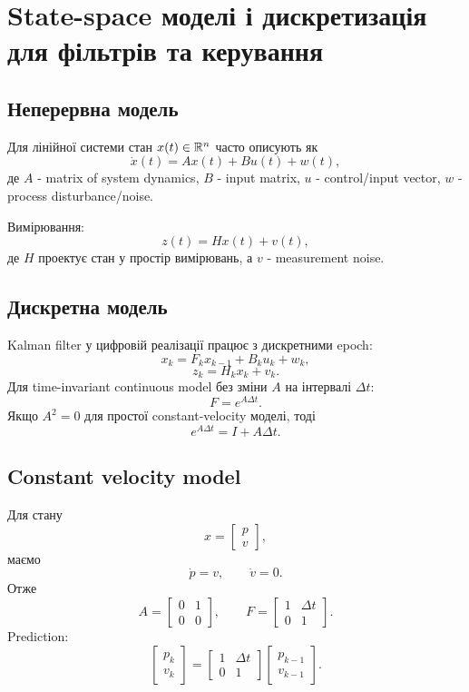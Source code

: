 \chapter{State-space моделі і дискретизація для фільтрів та керування}
\label{ch:state-space-discretization-core}


\section{Неперервна модель}

Для лінійної системи стан $x(t)\in\mathbb{R}^n$ часто описують як
\[
  \dot x(t)=A x(t)+B u(t)+w(t),
\]
де $A$ - matrix of system dynamics, $B$ - input matrix, $u$ - control/input vector, $w$ - process disturbance/noise.

Вимірювання:
\[
  z(t)=H x(t)+v(t),
\]
де $H$ проектує стан у простір вимірювань, а $v$ - measurement noise.

\section{Дискретна модель}

Kalman filter у цифровій реалізації працює з дискретними epoch:
\[
  x_k=F_k x_{k-1}+B_k u_k+w_k,
\]
\[
  z_k=H_k x_k+v_k.
\]
Для time-invariant continuous model без зміни $A$ на інтервалі $\Delta t$:
\[
  F=e^{A\Delta t}.
\]
Якщо $A^2=0$ для простої constant-velocity моделі, тоді
\[
  e^{A\Delta t}=I+A\Delta t.
\]

\section{Constant velocity model}

Для стану
\[
  x=\begin{bmatrix}p\\v\end{bmatrix},
\]
маємо
\[
  \dot p=v,
  \qquad
  \dot v=0.
\]
Отже
\[
  A=\begin{bmatrix}0&1\\0&0\end{bmatrix},
  \qquad
  F=\begin{bmatrix}1&\Delta t\\0&1\end{bmatrix}.
\]
Prediction:
\[
  \begin{bmatrix}p_k\\v_k\end{bmatrix}
  =
  \begin{bmatrix}1&\Delta t\\0&1\end{bmatrix}
  \begin{bmatrix}p_{k-1}\\v_{k-1}\end{bmatrix}.
\]

